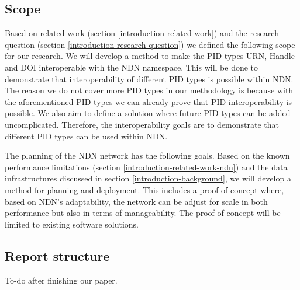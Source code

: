 \subsection{Scope}
\label{introduction-scope}

Based on related work (section \ref{introduction-related-work}) and the research question (section \ref{introduction-research-question}) we defined the following scope for our research. We will develop a method to make the PID types URN, Handle and DOI interoperable with the NDN namespace. This will be done to demonstrate that interoperability of different PID types is possible within NDN. The reason we do not cover more PID types in our methodology is because with the aforementioned PID types we can already prove that PID interoperability is possible. We also aim to define a solution where future PID types can be added uncomplicated. Therefore, the interoperability goals are to demonstrate that different PID types can be used within NDN. 

The planning of the NDN network has the following goals. Based on the known performance limitations (section \ref{introduction-related-work-ndn}) and the data infrastructures discussed in section \ref{introduction-background}, we will develop a method for planning and deployment. This includes a proof of concept where, based on NDN's adaptability, the network can be adjust for scale in both performance but also in terms of manageability. The proof of concept will be limited to existing software solutions.

\subsection{Report structure}
To-do after finishing our paper.



